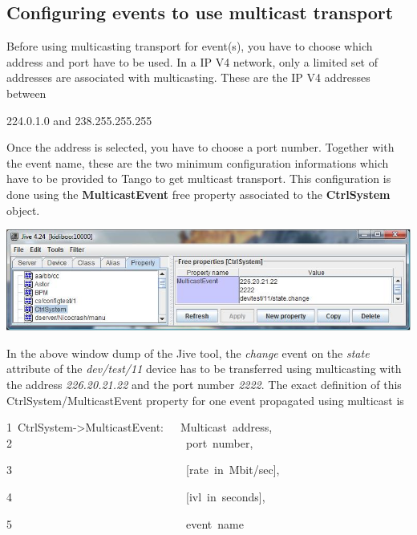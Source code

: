 \subsection{Configuring events to use multicast transport}

Before using multicasting transport for event(s), you have to choose
which address and port have to be used. In a IP V4 network, only a
limited set of addresses are associated with multicasting. These are
the IP V4 addresses between \begin{center}224.0.1.0 and 238.255.255.255\end{center}
Once the address is selected, you have to choose a port number. Together
with the event name, these are the two minimum configuration informations
which have to be provided to Tango to get multicast transport. This
configuration is done using the \textbf{MulticastEvent}
free property associated to the \textbf{CtrlSystem}
object. \begin{center}

\includegraphics[scale=0.7]{advanced/jive_simpl}\end{center}

In the above window dump of the Jive tool, the \emph{change} event
on the \emph{state} attribute of the \emph{dev/test/11} device has
to be transferred using multicasting with the address \emph{226.20.21.22}
and the port number \emph{2222}. The exact definition of this CtrlSystem/MulticastEvent
property for one event propagated using multicast is



\begin{lyxcode}
1~CtrlSystem->MulticastEvent:~~~Multicast~address,
2~~~~~~~~~~~~~~~~~~~~~~~~~~~~~~~port~number,

3~~~~~~~~~~~~~~~~~~~~~~~~~~~~~~~{[}rate~in~Mbit/sec{]},

4~~~~~~~~~~~~~~~~~~~~~~~~~~~~~~~{[}ivl~in~seconds{]},

5~~~~~~~~~~~~~~~~~~~~~~~~~~~~~~~event~name
\end{lyxcode}



